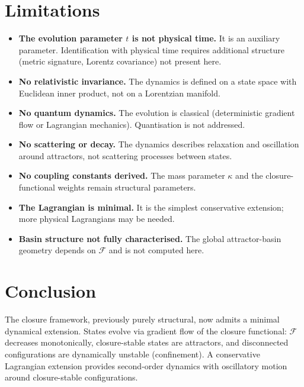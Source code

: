 \documentclass[12pt]{article}
\newcommand{\Fcal}{\mathcal{F}}
\begin{document}
\section{Limitations}\label{sec:limits}

\begin{itemize}
    \item \textbf{The evolution parameter $t$ is not physical time.} It is an auxiliary parameter. Identification with physical time requires additional structure (metric signature, Lorentz covariance) not present here.
    \item \textbf{No relativistic invariance.} The dynamics is defined on a state space with Euclidean inner product, not on a Lorentzian manifold.
    \item \textbf{No quantum dynamics.} The evolution is classical (deterministic gradient flow or Lagrangian mechanics). Quantisation is not addressed.
    \item \textbf{No scattering or decay.} The dynamics describes relaxation and oscillation around attractors, not scattering processes between states.
    \item \textbf{No coupling constants derived.} The mass parameter $\kappa$ and the closure-functional weights remain structural parameters.
    \item \textbf{The Lagrangian is minimal.} It is the simplest conservative extension; more physical Lagrangians may be needed.
    \item \textbf{Basin structure not fully characterised.} The global attractor-basin geometry depends on $\Fcal$ and is not computed here.
\end{itemize}

\section{Conclusion}\label{sec:conclusion}

The closure framework, previously purely structural, now admits a minimal dynamical extension. States evolve via gradient flow of the closure functional: $\Fcal$ decreases monotonically, closure-stable states are attractors, and disconnected configurations are dynamically unstable (confinement). A conservative Lagrangian extension provides second-order dynamics with oscillatory motion around closure-stable configurations.
\end{document}
